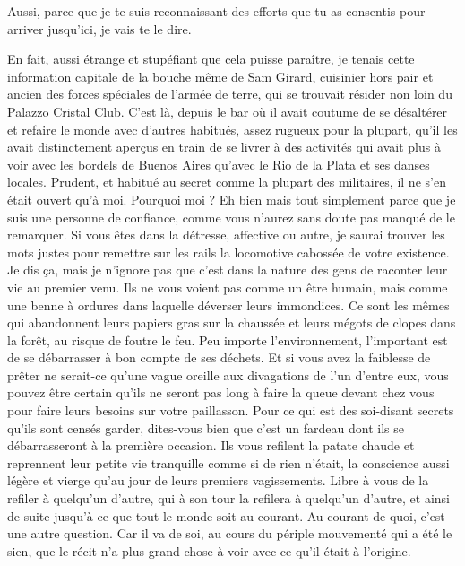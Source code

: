 %
%
Aussi, parce que je te suis reconnaissant des efforts que tu as consentis pour arriver jusqu’ici, je vais te le dire.

En fait, aussi étrange et stupéfiant que cela puisse paraître, je tenais cette information capitale de la bouche même de Sam Girard, cuisinier hors pair et ancien des forces spéciales de l’armée de terre, qui se trouvait résider non loin du Palazzo Cristal Club. C’est là, depuis le bar où il avait coutume de se désaltérer et refaire le monde avec d’autres habitués, assez rugueux pour la plupart, qu’il les avait distinctement aperçus en train de se livrer à des activités qui avait plus à voir avec les bordels de Buenos Aires qu’avec le Rio de la Plata et ses danses locales. Prudent, et habitué au secret comme la plupart des militaires, il ne s’en était ouvert qu’à moi. Pourquoi moi ? Eh bien mais tout simplement parce que je suis une personne de confiance, comme vous n’aurez sans doute pas manqué de le remarquer. Si vous êtes dans la détresse, affective ou autre, je saurai trouver les mots justes pour remettre sur les rails la locomotive cabossée de votre existence. Je dis ça, mais je n’ignore pas que c’est dans la nature des gens de raconter leur vie au premier venu. Ils ne vous voient pas comme un être humain, mais comme une benne à ordures dans laquelle déverser leurs immondices. Ce sont les mêmes qui abandonnent leurs papiers gras sur la chaussée et leurs mégots de clopes dans la forêt, au risque de foutre le feu. Peu importe l’environnement, l’important est de se débarrasser à bon compte de ses déchets. Et si vous avez la faiblesse de prêter ne serait-ce qu’une vague oreille aux divagations de l’un d’entre eux, vous pouvez être certain qu’ils ne seront pas long à faire la queue devant chez vous pour faire leurs besoins sur votre paillasson. Pour ce qui est des soi-disant secrets qu’ils sont censés garder, dites-vous bien que c’est un fardeau dont ils se débarrasseront à la première occasion. Ils vous refilent la patate chaude et reprennent leur petite vie tranquille comme si de rien n’était, la conscience aussi légère et vierge qu’au jour de leurs premiers vagissements. Libre à vous de la refiler à quelqu’un d’autre, qui à son tour la refilera à quelqu’un d’autre, et ainsi de suite jusqu’à ce que tout le monde soit au courant. Au courant de quoi, c’est une autre question. Car il va de soi, au cours du périple mouvementé qui a été le sien, que le récit n’a plus grand-chose à voir avec ce qu’il était à l’origine.

